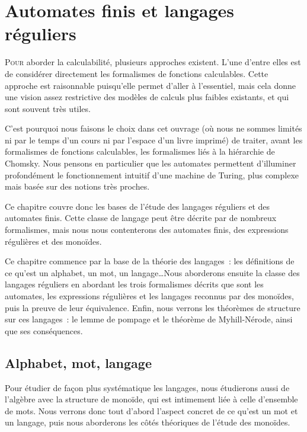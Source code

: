 \chapter{Automates finis et langages réguliers}
\label{chp.auto}

\minitoc

\lettrine{P}{our} aborder la calculabilité, plusieurs approches existent. L'une
d'entre elles est de considérer directement les formalismes de fonctions
calculables. Cette approche est raisonnable puisqu'elle permet d'aller à
l'essentiel, mais cela donne une vision assez restrictive des modèles de calculs
plus faibles existants, et qui sont souvent très utiles.

C'est pourquoi nous faisons le choix dans cet ouvrage (où nous ne sommes limités
ni par le temps d'un cours ni par l'espace d'un livre imprimé) de traiter, avant
les formalismes de fonctions calculables, les formalismes liés à la hiérarchie
de Chomsky. Nous pensons en particulier que les automates permettent d'illuminer
profondément le fonctionnement intuitif d'une machine de Turing, plus complexe
mais basée sur des notions très proches.

Ce chapitre couvre donc les bases de l'étude des langages réguliers et des
automates finis. Cette classe de langage peut être décrite par de nombreux
formalismes, mais nous nous contenterons des automates finis, des expressions
régulières et des monoïdes.

Ce chapitre commence par la base de la théorie des langages~: les définitions
de ce qu'est un alphabet, un mot, un langage\ldots Nous aborderons ensuite la
classe des langages réguliers en abordant les trois formalismes décrits que sont
les automates, les expressions régulières et les langages reconnus par des
monoïdes, puis la preuve de leur équivalence. Enfin, nous verrons les théorèmes
de structure sur ces langages~: le lemme de pompage et le théorème de
Myhill-Nérode, ainsi que ses conséquences.

\section{Alphabet, mot, langage}

Pour étudier de façon plus systématique les langages, nous étudierons aussi de
l'algèbre avec la structure de monoïde, qui est intimement liée à celle
d'ensemble de mots. Nous verrons donc tout d'abord l'aspect concret de ce qu'est
un mot et un langage, puis nous aborderons les côtés théoriques de l'étude des
monoïdes.

